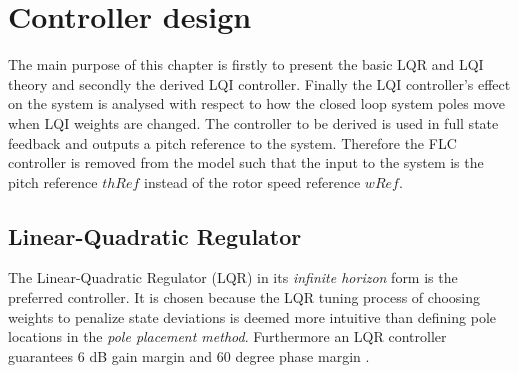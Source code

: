 \section{Controller design} \label{sec:ctrl-design}
The main purpose of this chapter is firstly to present the basic LQR and LQI theory and secondly the derived LQI controller. Finally the LQI controller's effect on the system is analysed with respect to how the closed loop system poles move when LQI weights are changed. The controller to be derived is used in full state feedback and outputs a pitch reference to the system. Therefore the FLC controller is removed from the model such that the input to the system is the pitch reference $ thRef $ instead of the rotor speed reference $ wRef $.

\subsection{Linear-Quadratic Regulator} \label{sec:ctrl_lqr}
The Linear-Quadratic Regulator (LQR) in its \textit{infinite horizon} form is the preferred controller. It is chosen because the LQR tuning process of choosing weights to penalize state deviations is deemed more intuitive than defining pole locations in the \textit{pole placement method}. Furthermore an LQR controller guarantees 6 dB gain margin and 60 degree phase margin \cite{Doyle1978}. 

